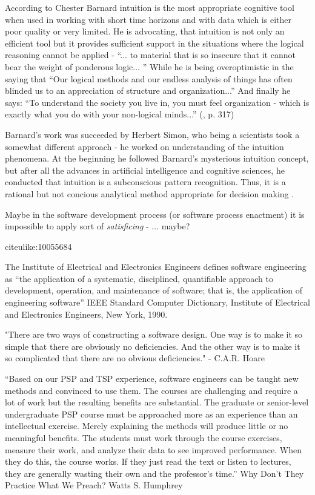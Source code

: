 According to Chester Barnard \cite{citeulike:1414171} intuition is the most appropriate 
cognitive tool when used in working with short time horizons and with data which is either 
poor quality or very limited. He is advocating, that intuition is not only an efficient 
tool but it provides sufficient support in the situations where the logical reasoning 
cannot be applied - ``... to material that is so insecure that it cannot bear the weight 
of ponderous logic... '' 
While he is being overoptimistic in the saying that ``Our logical methods and our endless 
analysis of things has often blinded us to an appreciation of structure and organization...''
And finally he says: ``To understand the society you live in, you must feel organization - 
which is exactly what you do with your non-logical minds...'' (\cite{citeulike:1414171}, p. 317)

Barnard's work was succeeded by Herbert Simon, who being a scientists took a somewhat 
different approach - he worked on understanding of the intuition phenomena. At the beginning 
he followed Barnard's mysterious intuition concept, but after all the advances in artificial
intelligence and cognitive sciences, he conducted that intuition is a subconscious pattern 
recognition. Thus, it is a rational but not concious analytical method appropriate for decision 
making \cite{citeulike:6708618}. 

Maybe in the software development process (or software process enactment) it is impossible 
to apply sort of \textsl{satisficing} \cite{citeulike:10055914} - ... maybe?



citeulike:10055684

The Institute of Electrical and Electronics Engineers defines software engineering as 
“the application of a systematic, disciplined, quantifiable approach to development, 
operation, and maintenance of software; that is, the application of engineering software”
IEEE Standard Computer Dictionary, Institute
of Electrical and Electronics Engineers, New
York, 1990.

"There are two ways of constructing a software design. One way is to make it so simple 
that there are obviously no deficiencies. And the other way is to make it so complicated that
there are no obvious deficiencies."
- C.A.R. Hoare

``Based on our PSP and TSP experience, software engineers can be taught new methods and
convinced to use them. The courses are challenging and require a lot of work but the 
resulting benefits are substantial. The graduate or senior-level undergraduate PSP 
course must be approached more as an experience than an intellectual exercise. 
Merely explaining the methods will produce little or no meaningful benefits. 
The students must work through the course exercises, measure their work, and 
analyze their data to see improved performance. When they do this, the course works. 
If they just read the text or listen to lectures, they are generally wasting their 
own and the professor's time.''
Why Don't They Practice What We Preach?
Watts S. Humphrey

